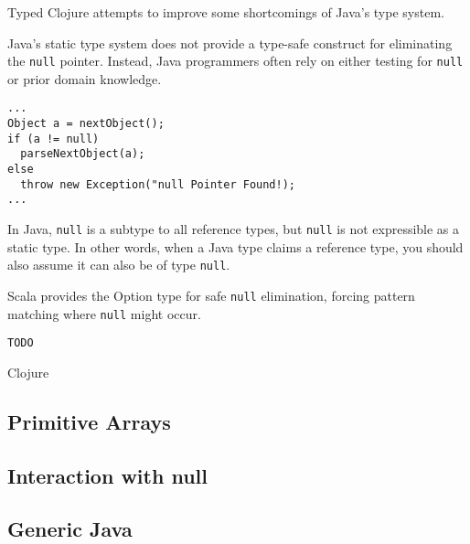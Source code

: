 Typed Clojure attempts to improve some shortcomings of Java's type system.

Java's static type system does not provide a type-safe construct for eliminating
the \lstinline|null| pointer. Instead, Java programmers often rely on either testing
for \lstinline|null| or prior domain knowledge.

\begin{lstlisting}[caption=null elimination in Java]
...
Object a = nextObject();
if (a != null)
  parseNextObject(a);
else
  throw new Exception("null Pointer Found!);
...
\end{lstlisting}



In Java, \lstinline|null| is a subtype to all reference
types, but \lstinline|null| is not expressible as a static type. In other words,
when a Java type claims a reference type, you should also assume it can also be of 
type \lstinline|null|.



Scala provides the Option type for safe \lstinline|null| elimination, forcing pattern matching
where \lstinline|null| might occur.

\begin{lstlisting}[caption=null elimination in Scala]
TODO
\end{lstlisting}

Clojure 

\subsection{Primitive Arrays}

\subsection{Interaction with null}
% 

\subsection{Generic Java}

